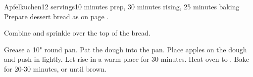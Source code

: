\documentclass[../Cookbook.tex]{subfiles}
\begin{document}
\begin{recipe}[Apfelkuchen]{Apfelkuchen}{12 servings}{10 minutes prep, 30 minutes rising, 25 minutes baking}
	Prepare dessert bread as on page \pageref{BaseDessertBread}.

	Combine and sprinkle over the top of the bread.
	
	Grease a 10" round pan.
	Pat the dough into the pan.
	Place apples on the dough and push in lightly.
	Let rise in a warm place for 30 minutes.
	Heat oven to .
	Bake for 20-30 minutes, or until brown.
\end{recipe}
\end{document}
